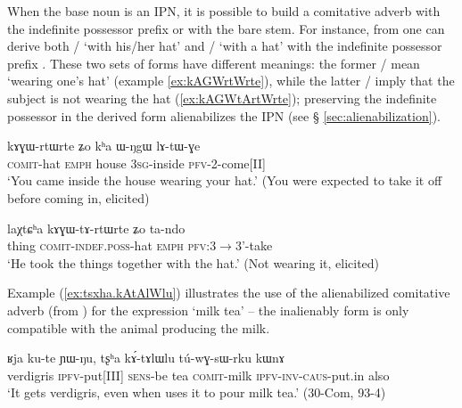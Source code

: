 When the base noun is an IPN, it is possible to build a comitative adverb with the indefinite possessor prefix or with the bare stem. For instance, from  one can derive both  /  `with his/her hat' and  /   `with a hat' with the indefinite possessor prefix . These two sets of forms have different meanings: the former  /  mean `wearing one's hat' (example \ref{ex:kAGWrtWrte}), while the latter  /   imply that the subject is not wearing the hat (\ref{ex:kAGWtArtWrte}); preserving the indefinite possessor in the derived form alienabilizes the IPN (see § \ref{sec:alienabilization}).

\begin{exe}
\ex \label{ex:kAGWrtWrte}
\gll kɤɣɯ-rtɯ\tld{}rte 	ʑo 	kʰa	ɯ-ŋgɯ	lɤ-tɯ-ɣe	\\
\textsc{comit}-hat \textsc{emph} house \textsc{3sg}-inside \textsc{pfv}-2-come[II] \\
\glt `You came inside the house wearing your hat.' (You were expected to take it off before coming in, elicited)
\end{exe}

\begin{exe}
\ex \label{ex:kAGWtArtWrte}
\gll  laχtɕʰa	kɤɣɯ-tɤ-rtɯ\redp{}rte	ʑo	ta-ndo \\
thing \textsc{comit-indef.poss}-hat \textsc{emph} \textsc{pfv}:3$\rightarrow$3'-take \\
\glt `He took the things together with the hat.' (Not wearing it, elicited)
\end{exe}

Example (\ref{ex:tsxha.kAtAlWlu}) illustrates the use of the alienabilized comitative adverb  (from ) for the expression `milk tea' -- the inalienably form  is only compatible with the animal producing the milk.

\begin{exe}
\ex \label{ex:tsxha.kAtAlWlu}
\gll   ʁja ku-te ɲɯ-ŋu, tʂʰa kɤ́-tɤlɯ\redp{}lu tú-wɣ-sɯ-rku kɯnɤ \\
verdigris \textsc{ipfv}-put[III] \textsc{sens}-be tea \textsc{comit}-milk \textsc{ipfv}-\textsc{inv}-\textsc{caus}-put.in also \\
\glt  `It gets verdigris, even when uses it to pour milk tea.'  (30-Com, 93-4)
\end{exe}

